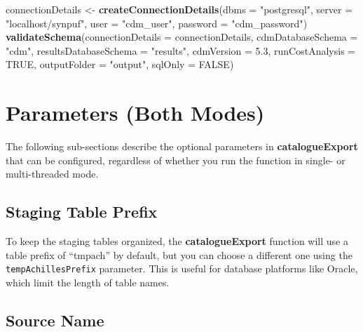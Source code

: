 \documentclass[
]{article}
\newenvironment{Shaded}{\begin{snugshade}}{\end{snugshade}}
\newcommand{\DataTypeTok}[1]{\textcolor[rgb]{0.13,0.29,0.53}{#1}}
\newcommand{\FloatTok}[1]{\textcolor[rgb]{0.00,0.00,0.81}{#1}}
\newcommand{\KeywordTok}[1]{\textcolor[rgb]{0.13,0.29,0.53}{\textbf{#1}}}
\newcommand{\NormalTok}[1]{#1}
\newcommand{\OtherTok}[1]{\textcolor[rgb]{0.56,0.35,0.01}{#1}}
\newcommand{\StringTok}[1]{\textcolor[rgb]{0.31,0.60,0.02}{#1}}
\begin{document}
\begin{Shaded}
\begin{Highlighting}[]
\NormalTok{connectionDetails <-}\StringTok{ }\KeywordTok{createConnectionDetails}\NormalTok{(}\DataTypeTok{dbms =} \StringTok{"postgresql"}\NormalTok{, }
                                             \DataTypeTok{server =} \StringTok{"localhost/synpuf"}\NormalTok{, }
                                             \DataTypeTok{user =} \StringTok{"cdm_user"}\NormalTok{, }
                                             \DataTypeTok{password =} \StringTok{"cdm_password"}\NormalTok{)}
\KeywordTok{validateSchema}\NormalTok{(}\DataTypeTok{connectionDetails =}\NormalTok{ connectionDetails, }
               \DataTypeTok{cdmDatabaseSchema =} \StringTok{"cdm"}\NormalTok{, }
               \DataTypeTok{resultsDatabaseSchema =} \StringTok{"results"}\NormalTok{, }
               \DataTypeTok{cdmVersion =} \FloatTok{5.3}\NormalTok{, }
               \DataTypeTok{runCostAnalysis =} \OtherTok{TRUE}\NormalTok{, }
               \DataTypeTok{outputFolder =} \StringTok{"output"}\NormalTok{, }
               \DataTypeTok{sqlOnly =} \OtherTok{FALSE}\NormalTok{)}
\end{Highlighting}
\end{Shaded}

\hypertarget{parameters-both-modes}{%
\section{Parameters (Both Modes)}\label{parameters-both-modes}}

The following sub-sections describe the optional parameters in
\textbf{catalogueExport} that can be configured, regardless of whether
you run the function in single- or multi-threaded mode.

\hypertarget{staging-table-prefix}{%
\subsection{Staging Table Prefix}\label{staging-table-prefix}}

To keep the staging tables organized, the \textbf{catalogueExport}
function will use a table prefix of ``tmpach'' by default, but you can
choose a different one using the \texttt{tempAchillesPrefix} parameter.
This is useful for database platforms like Oracle, which limit the
length of table names.

\hypertarget{source-name}{%
\subsection{Source Name}\label{source-name}}
\end{document}
